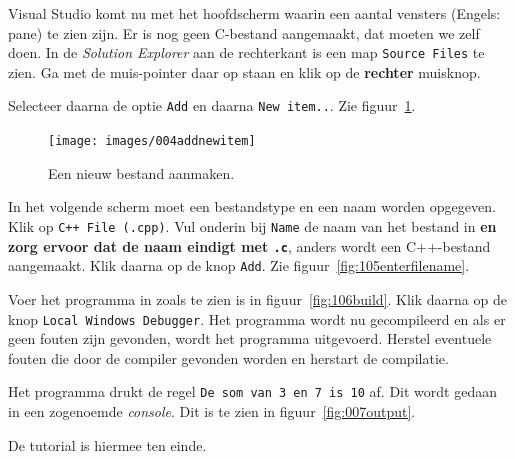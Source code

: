 Visual Studio komt nu met het hoofdscherm waarin een aantal vensters (Engels: pane) te zien zijn. Er is nog geen C-bestand aangemaakt, dat moeten we zelf doen. In de \textsl{Solution Explorer} aan de rechterkant is een map \texttt{Source Files} te zien. Ga met de muis-pointer daar op staan en klik op de \textbf{rechter} muisknop.

Selecteer daarna de optie \texttt{Add} en daarna \texttt{New item..}. Zie figuur~\ref{fig:004addnewitem}.

\begin{figure}[H]
\centering
\texttt{[image: images/004addnewitem]}
\caption{Een nieuw bestand aanmaken.}
\label{fig:004addnewitem}
\end{figure}

In het volgende scherm moet een bestandstype en een naam worden opgegeven. Klik op \texttt{C++ File (.cpp)}. Vul onderin bij  \texttt{Name} de naam van het bestand in \textbf{en zorg ervoor dat de naam eindigt met \texttt{.c}}, anders wordt een C++-bestand aangemaakt. Klik daarna op de knop \texttt{Add}. Zie figuur~\ref{fig:105enterfilename}.

Voer het programma in zoals te zien is in figuur~\ref{fig:106build}. Klik daarna op de knop \texttt{Local Windows Debugger}. Het programma wordt nu gecompileerd en als er geen fouten zijn gevonden, wordt het programma uitgevoerd. Herstel eventuele fouten die door de compiler gevonden worden en herstart de compilatie.

Het programma drukt de regel \texttt{De som van 3 en 7 is 10} af. Dit wordt gedaan in een zogenoemde \textsl{console}. Dit is te zien in figuur~\ref{fig:007output}.

De tutorial is hiermee ten einde.


